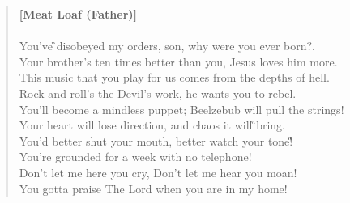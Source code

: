 \documentclass[9pt,a4paper,oneside, onecolumn]{article}
\begin{document}
\begin{verse}
\textbf{[Meat Loaf (Father)]}\\
\mbox{
}\\
You've \G{}disobeyed my orders, son, why \Hb{}were you ever born?.\\
Your \F{}brother's ten times better than you, \Gis{}Jesus loves him more.\\
This music that you play for us comes from the depths of hell.\\
Rock and roll's the Devil's work, he wants you to rebel.\\
You'll become a mindless puppet; Beelzebub will pull the strings!\\
Your heart will lose direction, and chaos it will \G{}bring.\\
You'd better shut your \Hb{}mouth, better watch your \F{}tone!\G{}\qquad\Cf{}\qquad\G{}\\
You're grounded for a week with no telephone!\\
Don't let me here you cry, Don't let me hear you moan!\\
You gotta praise The Lord when you are in my home!\\
\end{verse}
\end{document}
